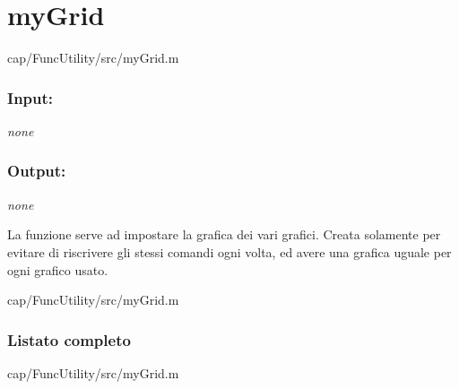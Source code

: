 \section{myGrid}\label{fnc:myGrid}


{cap/FuncUtility/src/myGrid.m}%

\subsubsection{Input:}
\textit{none}

\subsubsection{Output:}
\textit{none}

La funzione serve ad impostare la grafica dei vari grafici. Creata solamente 
per evitare di riscrivere gli stessi comandi ogni volta, ed avere una grafica 
uguale per ogni grafico usato. 


{cap/FuncUtility/src/myGrid.m}%

\begin{changelog}[author=\CGC, simple, 
    title={Modifiche alla funzione}, 
    label=chgf:myGrid, sectioncmd=\subsubsection*]
        
\end{changelog}
\newpage
\subsubsection{Listato completo}

{cap/FuncUtility/src/myGrid.m}%